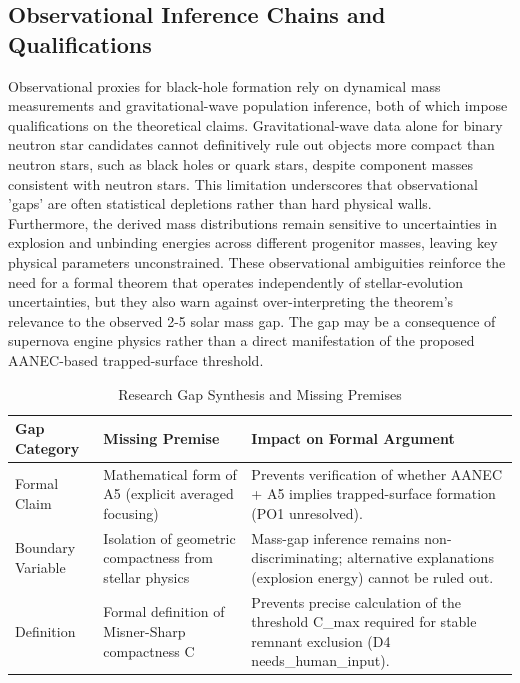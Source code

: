 \documentclass[conference]{IEEEtran}
\begin{document}
\subsection{Observational Inference Chains and Qualifications}
Observational proxies for black-hole formation rely on dynamical mass measurements and gravitational-wave population inference, both of which impose qualifications on the theoretical claims. Gravitational-wave data alone for binary neutron star candidates cannot definitively rule out objects more compact than neutron stars, such as black holes or quark stars, despite component masses consistent with neutron stars. This limitation underscores that observational 'gaps' are often statistical depletions rather than hard physical walls. Furthermore, the derived mass distributions remain sensitive to uncertainties in explosion and unbinding energies across different progenitor masses, leaving key physical parameters unconstrained. These observational ambiguities reinforce the need for a formal theorem that operates independently of stellar-evolution uncertainties, but they also warn against over-interpreting the theorem's relevance to the observed 2-5 solar mass gap. The gap may be a consequence of supernova engine physics rather than a direct manifestation of the proposed AANEC-based trapped-surface threshold.~\cite{cite_07d6df5d6978a1fc}

\begin{table}[htbp]
\centering
\footnotesize
\setlength{\tabcolsep}{3pt}
\renewcommand{\arraystretch}{1.12}
\caption{Research Gap Synthesis and Missing Premises}
\label{tab:survey-and-research-gap-block-4}
\begin{tabular}{|p{}|p{}|p{}|}
\hline
Gap Category & Missing Premise & Impact on Formal Argument \\\hline
Formal Claim & Mathematical form of A5 (explicit averaged focusing) & Prevents verification of whether AANEC + A5 implies trapped-surface formation (PO1 unresolved). \\\hline
Boundary Variable & Isolation of geometric compactness from stellar physics & Mass-gap inference remains non-discriminating; alternative explanations (explosion energy) cannot be ruled out. \\\hline
Definition & Formal definition of Misner-Sharp compactness C & Prevents precise calculation of the threshold C\_max required for stable remnant exclusion (D4 needs\_human\_input). \\\hline
\end{tabular}
\end{table}
\end{document}
